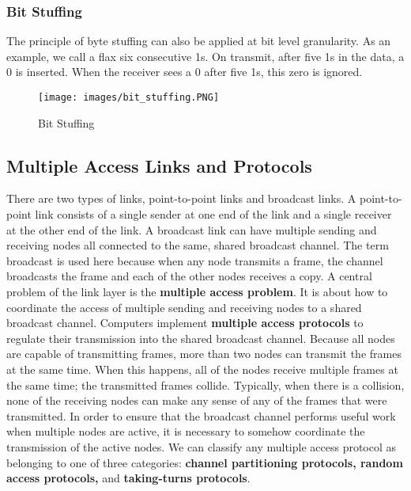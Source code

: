 \subsubsection{Bit Stuffing}
The principle of byte stuffing can also be applied at bit level granularity. As an example, we call a flax six consecutive 1s. On transmit, after five 1s in the data, a 0 is inserted. When the receiver sees a 0 after five 1s, this zero is ignored.
\begin{figure}[H]
\centering
\texttt{[image: images/bit\_stuffing.PNG]}
\label{bit_stuffing}
\caption{Bit Stuffing}
\end{figure}


\subsection{Multiple Access Links and Protocols}
There are two types of links, point-to-point links and broadcast links. A point-to-point link consists of a single sender at one end of the link and a single receiver at the other end of the link. A broadcast link can have multiple sending and receiving nodes all connected to the same, shared broadcast channel. The term broadcast is used here because when any node transmits a frame, the channel broadcasts the frame and each of the other nodes receives a copy. A central problem of the link layer is the \textbf{multiple access problem}. It is about how to coordinate the access of multiple sending and receiving nodes to a shared broadcast channel. Computers implement \textbf{multiple access protocols} to regulate their transmission into the shared broadcast channel. Because all nodes are capable of transmitting frames, more than two nodes can transmit the frames at the same time. When this happens, all of the nodes receive multiple frames at the same time; the transmitted frames collide. Typically, when there is a collision, none of the receiving nodes can make any sense of any of the frames that were transmitted. In order to ensure that the broadcast channel performs useful work when multiple nodes are active, it is necessary to somehow coordinate the transmission of the active nodes. We can classify any multiple access protocol as belonging to one of three categories: \textbf{channel partitioning protocols, random access protocols,} and \textbf{taking-turns protocols}.

